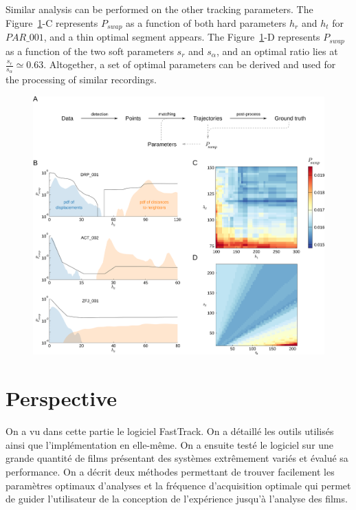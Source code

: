     Similar analysis can be performed on the other tracking parameters. The Figure~\ref{part_1:fig_4}-C represents $P_{swap}$ as a function of both hard parameters $h_r$ and $h_t$ for $PAR\_001$, and a thin optimal segment appears. The Figure~\ref{part_1:fig_4}-D represents $P_{swap}$ as a function of the two soft parameters $s_r$ and $s_\alpha$, and an optimal ratio lies at $\frac{s_r}{s_\alpha} \simeq 0.63$. Altogether, a set of optimal parameters can be derived and used for the processing of similar recordings.

    \begin{figure}[h!]
    \centering
    \includegraphics[width=1\textwidth]{part_1/assets/Figure_4.png}
    \caption{\textbf{}}
    \label{part_1:fig_4}
    \end{figure}
	
\chapter{Perspective}

	On a vu dans cette partie le logiciel FastTrack. On a détaillé les outils utilisés ainsi que l'implémentation en elle-même. On a ensuite testé le logiciel sur une grande quantité de films présentant des systèmes extrêmement variés et évalué sa performance. On a décrit deux méthodes permettant de trouver facilement les paramètres optimaux d'analyses et la fréquence d'acquisition optimale qui permet de guider l'utilisateur de la conception de l'expérience jusqu'à l'analyse des films.

